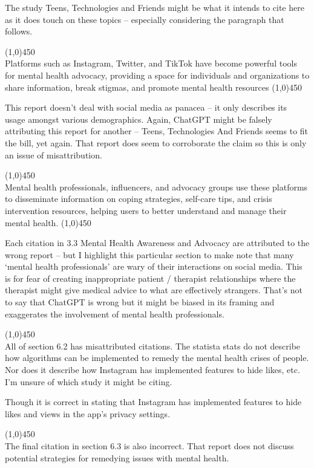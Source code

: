 \documentclass[12pt]{article}
\begin{document}
The study Teens, Technologies and Friends\cite{lenhart2015} might be what it intends to cite here as it does touch on these topics -- especially considering the paragraph that follows. 

\begin{center}
    \line(1,0){450}\\
    Platforms such as Instagram, Twitter, and TikTok have become powerful tools for mental health advocacy, providing a space for individuals and organizations to share information, break stigmas, and promote mental health resources \cite{smith2018}
    \line(1,0){450}
\end{center}
This report doesn't deal with social media as panacea -- it only describes its usage amongst various demographics. Again, ChatGPT might be falsely attributing this report for another -- Teens, Technologies And Friends\cite{lenhart2015} seems to fit the bill, yet again. That report does seem to corroborate the claim so this is only an issue of misattribution.

\begin{center}
    \line(1,0){450}\\
    Mental health professionals, influencers, and advocacy groups use these platforms to disseminate information on coping strategies, self-care tips, and crisis intervention resources, helping users to better understand and manage their mental health.
    \line(1,0){450}
\end{center}
Each citation in 3.3 Mental Health Awareness and Advocacy are attributed to the wrong report -- but I highlight this particular section to make note that many `mental health professionals' are wary of their interactions on social media. This is for fear of creating inappropriate patient / therapist relationships where the therapist might give medical advice to what are effectively strangers. That's not to say that ChatGPT is wrong but it might be biased in its framing and exaggerates the involvement of mental health professionals. 

\line(1,0){450}\\

All of section 6.2 has misattributed citations. The statista stats do not describe how algorithms can be implemented to remedy the mental health crises of people. Nor does it describe how Instagram has implemented features to hide likes, etc. I'm unsure of which study it might be citing.

Though it is correct in stating that Instagram has implemented features to hide likes and views in the app's privacy settings.

\line(1,0){450}\\
The final citation in section 6.3 is also incorrect. That report does not discuss potential strategies for remedying issues with mental health. 
\end{document}
